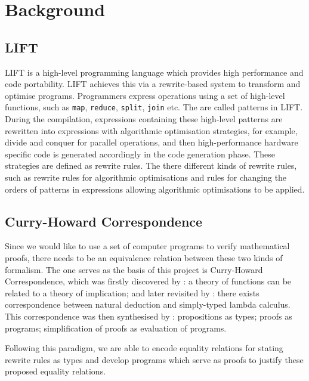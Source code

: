 \documentclass{l4proj}
\begin{document}
\chapter{Background}
\label{ch:background}
\section{LIFT}
LIFT \citep{steuwer2015generating} is a high-level programming language which provides high performance and code portability. LIFT achieves this via a rewrite-based system to transform and optimise programs. Programmers express operations using a set of high-level functions, such as \texttt{map}, \texttt{reduce}, \texttt{split}, \texttt{join} etc. The are called patterns in LIFT. During the compilation, expressions containing these high-level patterns are rewritten into expressions with algorithmic optimisation strategies, for example, divide and conquer for parallel operations, and then high-performance hardware specific code is generated accordingly in the code generation phase. These strategies are defined as rewrite rules. The there different kinds of rewrite rules, such as rewrite rules for algorithmic optimisations and rules for changing the orders of patterns in expressions allowing algorithmic optimisations to be applied.

\section{Curry-Howard Correspondence}
\label{sec:curry-howard}
Since we would like to use a set of computer programs to verify mathematical proofs, there needs to be an equivalence relation between these two kinds of formalism. The one serves as the basis of this project is Curry-Howard Correspondence, which was firstly discovered by \cite{curry1934functionality}: a theory of functions can be related to a theory of implication; and later revisited by \cite{howard1980formulae}: there exists correspondence between natural deduction and simply-typed lambda calculus. This correspondence was then synthesised by \cite{wadler2015propositions}: propositions as types; proofs as programs; simplification of proofs as evaluation of programs.

Following this paradigm, we are able to encode equality relations for stating rewrite rules as types and develop programs which serve as proofs to justify these proposed equality relations.
\end{document}
